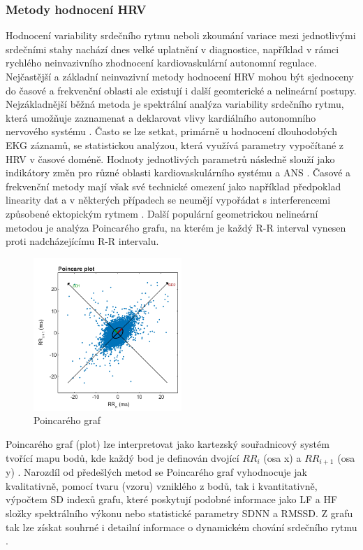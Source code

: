 \subsubsection{Metody hodnocení HRV}
\label{section:hrv_methods}
Hodnocení variability srdečního rytmu neboli zkoumání variace mezi jednotlivými
srdečními stahy nachází dnes velké uplatnění v diagnostice, například v rámci
rychlého neinvazivního zhodnocení kardiovaskulární autonomní regulace.
Nejčastější a základní neinvazivní metody hodnocení HRV mohou být sjednoceny do
časové a frekvenční oblasti ale existují i další geomterické a nelineární
postupy. Nejzákladnější běžná metoda je spektrální analýza variability srdečního
rytmu, která umožňuje zaznamenat a deklarovat vlivy kardiálního autonomního
nervového systému \cite{Pumprla2014}. Často se lze setkat, primárně u hodnocení
dlouhodobých EKG záznamů, se statistickou analýzou, která využívá parametry
vypočítané z HRV v časové doméně. Hodnoty jednotlivých parametrů následně slouží
jako indikátory změn pro různé oblasti kardiovaskulárního systému a ANS
\cite{Malik1996}. Časové a frekvenční metody mají však své technické omezení
jako například předpoklad linearity dat a v některých případech se neumějí
vypořádat s interferencemi způsobené ektopickým rytmem \cite{Hsu2012}. Další
populární geometrickou nelineární metodou je analýza Poincarého grafu, na kterém
je každý R-R interval vynesen proti nadcházejícímu R-R intervalu. 

\begin{figure}[h]
	\begin{center}
		\includegraphics[width=0.5\textwidth]{../assets/figures/wiki_poincare}
		\caption{Poincarého graf \cite{wikiPoincare}}
		\label{fig:wiki_poincare}
	\end{center}
\end{figure}

Poincarého graf (plot) lze interpretovat jako kartezský souřadnicový systém
tvořící mapu bodů, kde každý bod je definován dvojící $RR_i$ (osa x) a
$RR_{i+1}$ (osa y) \cite{Hsu2012,Hejjel2001}. Narozdíl od předešlých metod se
Poincarého graf vyhodnocuje jak kvalitativně, pomocí tvaru (vzoru) vzniklého z
bodů, tak i kvantitativně, výpočtem SD indexů grafu, které poskytují podobné
informace jako LF a HF složky spektrálního výkonu nebo statistické parametry
SDNN a RMSSD. Z grafu tak lze získat souhrné i detailní informace o dynamickém
chování srdečního rytmu \cite{Hsu2012,Kubickova2016}. 

